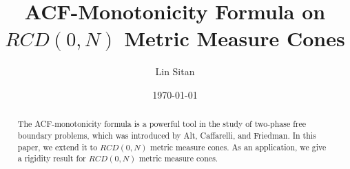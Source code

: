\documentclass{article}
\theoremstyle{remark}
\numberwithin{equation}{section}
\theoremstyle{definition}
\begin{document}
\title{ACF-Monotonicity Formula on $RCD(0,N)$ Metric Measure Cones}
\author{
	Lin Sitan
	\footnotemark[1]
}
\renewcommand{\thefootnote}{\fnsymbol{footnote}}
\date{\today}

\maketitle
\begin{abstract}
    The ACF-monotonicity formula is a powerful tool in the study of two-phase free boundary problems, which was introduced by Alt, Caffarelli, and Friedman\cite{Alt-Caffarelli-Friedman_1984}. In this paper, we extend it to $RCD(0,N)$ metric measure cones. As an application, we give a rigidity result for $RCD(0,N)$ metric measure cones.
\end{abstract}
\end{document}
